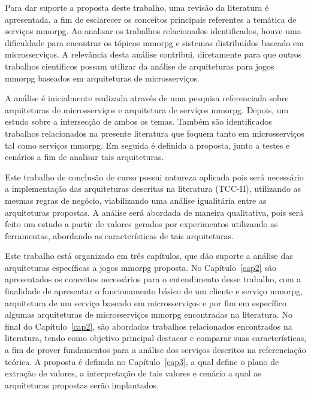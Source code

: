 Para dar suporte a proposta deste trabalho, uma revisão da literatura é apresentada, a fim de esclarecer os conceitos principais referentes a temática de serviços \ac{mmorpg}.
%
Ao analisar os trabalhos relacionados identificados, houve uma dificuldade para encontrar os tópicos \ac{mmorpg} e sistemas distribuídos baseado em microsserviços.
%
A relevância desta análise contribui, diretamente para que outros trabalhos científicos possam utilizar da análise de arquiteturas para jogos \ac{mmorpg} baseados em arquiteturas de microsserviços.



A análise é inicialmente realizada através de uma pesquisa referenciada sobre arquiteturas de microsserviços e arquitetura de serviços \ac{mmorpg}.
%
Depois, um estudo sobre a intersecção de ambos os temas.
%
Também são identificados trabalhos relacionados na presente literatura que foquem tanto em microsserviços tal como serviços \ac{mmorpg}.
%
Em seguida é definida a proposta, junto a testes e cenários a fim de analisar tais arquiteturas. 



Este trabalho de conclusão de curso possui natureza aplicada pois será necessário a implementação das arquiteturas descritas na literatura (TCC-II), utilizando as mesmas regras de negócio, viabilizando uma análise igualitária entre as arquiteturas propostas.
%
A análise será abordada de maneira qualitativa, pois será feito um estudo a partir de valores gerados por experimentos utilizando as ferramentas, abordando as características de tais arquiteturas.



Este trabalho está organizado em três capítulos, que dão suporte a análise das arquiteturas específicas a jogos \ac{mmorpg} proposta.
%
No Capítulo~\ref{cap2} são apresentados os conceitos necessários para o entendimento desse trabalho, com a finalidade de apresentar o funcionamento básico de um cliente e serviço \ac{mmorpg}, arquitetura de um serviço baseado em microsserviços e por fim em específico algumas arquiteturas de microsserviços \ac{mmorpg} encontradas na literatura.
%
No final do Capítulo~\ref{cap2}, são abordados trabalhos relacionados encontrados na literatura, tendo como objetivo principal destacar e comparar suas características, a fim de prover fundamentos para a análise dos serviços descritos na referenciação teórica.
%
A proposta é definida no Capítulo~\ref{cap3}, a qual define o plano de extração de valores, a interpretação de tais valores e cenário a qual as arquiteturas propostas serão implantados.
%
